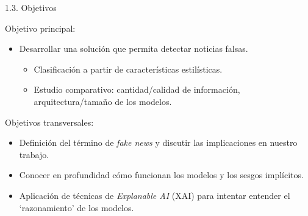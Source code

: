 \begin{frame}{1.3. Objetivos}

Objetivo principal:
\begin{itemize}
    \item Desarrollar una solución que permita detectar noticias falsas.
    \begin{itemize}
        \item Clasificación a partir de características estilísticas.
        \item Estudio comparativo: cantidad/calidad de información, arquitectura/tamaño de los modelos. 
    \end{itemize}
\end{itemize}

\vspace{2ex}

Objetivos transversales:
\begin{itemize}
    \item Definición del término de \textit{fake news} y discutir las implicaciones en nuestro trabajo.
    \item Conocer en profundidad cómo funcionan los modelos y los sesgos implícitos.
    \item Aplicación de técnicas de \textit{Explanable AI} (XAI) para intentar entender el `razonamiento' de los modelos.
\end{itemize}

\end{frame}